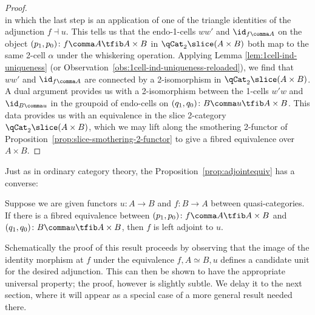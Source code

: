 \begin{proof}
\begin{equation*}
\end{equation*} 
in which the last step is an application of one of the triangle identities of the adjunction $f\dashv u$. This tells us that the endo-1-cells $ww'$ and $\id_{f\comma A}$ on the object $(p_1,p_0)\colon f\comma A\tfib A\times B$ in $\qCat_2\slice(A\times B)$ both map to the same 2-cell $\alpha$ under the whiskering operation. Applying Lemma \ref{lem:1cell-ind-uniqueness} (or Observation~\ref{obs:1cell-ind-uniqueness-reloaded}), 
we find that  $ww'$ and $\id_{f\comma A}$ are connected by a 2-isomorphism in $\qCat_2\slice(A\times B)$. A dual argument provides us with a 2-isomorphism between the 1-cells $w' w$ and $\id_{B\comma u}$ in the groupoid of endo-cells on $(q_1,q_0)\colon B\comma u\tfib A\times B$. This data provides us with an equivalence in the slice 2-category $\qCat_2\slice(A\times B)$, which we may lift along the smothering 2-functor of Proposition~\ref{prop:slice-smothering-2-functor} to give a fibred equivalence over $A\times B$.
\end{proof}

Just as in ordinary category theory, the Proposition~\ref{prop:adjointequiv} has a converse:

\begin{prop}\label{prop:adjointequivconverse} Suppose we are given functors $u \colon A \to B$ and $f\colon B\to A$ between quasi-categories. If there is a fibred equivalence between $(p_1,p_0)\colon f \comma A\tfib A\times B$ and $(q_1,q_0)\colon B \comma u\tfib A\times B$, then $f$ is left adjoint to $u$.
\end{prop}

    Schematically the proof of this result proceeds by observing that the image of the identity morphism at $f$ under the equivalence $f \comma A \simeq B \comma u$ defines a candidate unit for the desired adjunction. This can then be shown to have the appropriate universal property; the proof, however is slightly subtle. We delay it to the next section, where it will appear as a special case of a more general result needed there.

